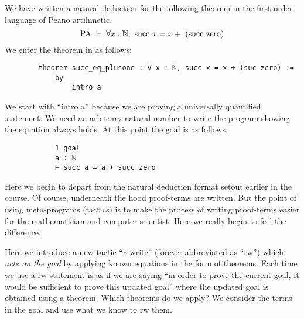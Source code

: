 \documentclass{book}
\begin{document}
\begin{eg}

    We have written a natural deduction for the following theorem in the first-order language of Peano artihmetic. $$ \text{PA} \ \vdash \ \forall x : \mathbb{N}, \ \text{succ} \ x = x + \ (\text{succ} \ \text{zero})$$ We enter the theorem in as follows: 
    \begin{center}
        \begin{lstlisting}
        theorem succ_eq_plusone : ∀ x : ℕ, succ x = x + (suc zero) :=
            by
                intro a
        \end{lstlisting}
    \end{center}
    We start with ``intro a'' because we are proving a universally quantified statement. We need an arbitrary natural number to write the program showing the equation always holds. At this point the goal is as follows: 
    \begin{center}
        \begin{lstlisting}
            1 goal            
            a : ℕ            
            ⊢ succ a = a + succ zero
        \end{lstlisting}
    \end{center}
    Here we begin to depart from the natural deduction format setout earlier in the course. Of course, underneath the hood proof-terms are written. But the point of using meta-programs (tactics) is to make the process of writing proof-terms easier for the mathematician and computer scientist. Here we really begin to feel the difference.

    Here we introduce a new tactic ``rewrite'' (forever abbreviated as ``rw'') which \emph{acts on the goal} by applying known equations in the form of theorems. Each time we use a rw statement is as if we are saying ``in order to prove the current goal, it would be sufficient to prove this updated goal'' where the updated goal is obtained using a theorem. Which theorems do we apply? We consider the terms in the goal and use what we know to rw them. 


\end{eg}
\end{document}
